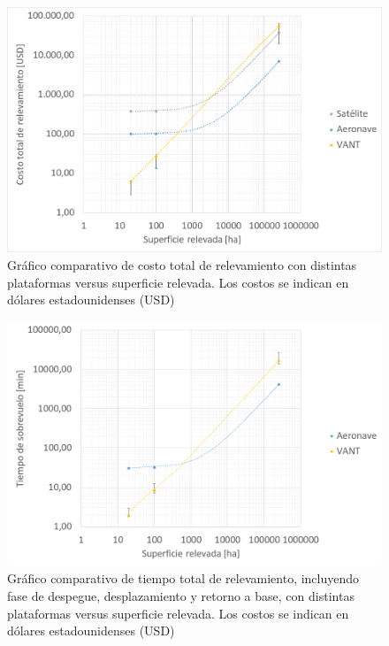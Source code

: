 \begin{figure}[h!]
    \includegraphics[width=\textwidth]{Imagenes/grafico bloque 1.png}
     \hfill
     \caption{Gráfico comparativo de costo total de relevamiento con distintas plataformas versus superficie relevada. Los costos se indican en dólares estadounidenses (USD)}
    \label{grafico_comparativo}
\end{figure}

\begin{figure}[h!]
    \includegraphics[width=\textwidth]{Imagenes/grafico bloque 1-II.png}
     \hfill
     \caption{Gráfico comparativo de tiempo total de relevamiento, incluyendo fase de despegue, desplazamiento y retorno a base, con distintas plataformas versus superficie relevada. Los costos se indican en dólares estadounidenses (USD)}
    \label{grafico_comparativo-II}
\end{figure}

